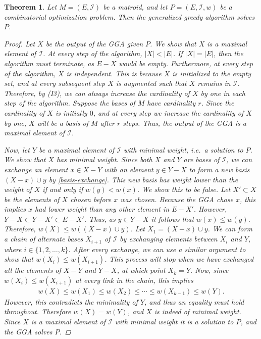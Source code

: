\documentclass[a4paper,11pt]{report}
\theoremstyle{plain}
\newtheorem{thm}{Theorem}[section]
\theoremstyle{definition}
\newcommand{\I}{\mathcal{I}}
\begin{document}
\begin{thm}\label{GGA-solves-matroids}
Let $M = (E,\I)$ be a matroid, and let $P = (E,\I,w)$ be a combinatorial
optimization problem. Then the generalized greedy algorithm solves $P$.

\begin{proof}

Let $X$ be the output of the GGA given $P$. We show that $X$ is a maximal
element of $\I$. At every step of the algorithm, $|X| < |E|$. If $|X| = |E|$,
then the algorithm must terminate, as $E - X$ would be empty. Furthermore, at
every step of the algorithm, $X$ is independent. This is because $X$ is
initialized to the empty set, and at every subsequent step $X$ is augmented
such that $X$ remains in $\I$. Therefore, by (I3), we can always increase the
cardinality of $X$ by one in each step of the algorithm. Suppose the bases of
$M$ have cardinality $r$.  Since the cardinality of $X$ is initially $0$, and
at every step we increase the cardinality of $X$ by one, $X$ will be a basis of
$M$ after $r$ steps. Thus, the output of the GGA is a maximal element of $\I$.

Now, let $Y$ be a maximal element of $\I$ with minimal weight, i.e.\ a solution
to $P$. We show that $X$ has minimal weight. Since both $X$ and $Y$ are bases
of $\I$, we can exchange an element $x \in X - Y$ with an element $y \in Y - X$
to form a new basis $(X - x) \cup y$ by \autoref{basis-exchange}. This new
basis has weight lower than the weight of $X$ if and only if $w(y) < w(x)$. We
show this to be false. Let $X' \subset X$ be the elements of $X$ chosen before
$x$ was chosen. Because the GGA chose $x$, this implies $x$ had lower weight
than any other element in $E - X'$. However, $Y - X \subset Y - X' \subset E -
X'$. Thus, as $y \in Y - X$ it follows that $w(x) \leq w(y)$. Therefore, $w(X)
\leq w((X - x) \cup y)$. Let $X_1 = (X - x) \cup y$. We can form a chain of
alternate bases $X_{i+1}$ of $\I$ by exchanging elements between $X_i$ and $Y$,
where $i \in \{1,2,\ldots,k\}$. After every exchange, we can use a similar
argument to show that $w(X_i) \leq w(X_{i+1})$. This process will stop when we
have exchanged all the elements of $X - Y$ and $Y - X$, at which point $X_k =
Y$. Now, since $w(X_i) \leq w(X_{i+1})$ at every link in the chain, this
implies
\begin{align*}
    w(X) \leq w(X_1) \leq w(X_2) \leq \cdots \leq w(X_{k - 1}) \leq w(Y).
\end{align*}
However, this contradicts the minimality of $Y$, and thus an equality must hold
throughout. Therefore $w(X) = w(Y)$, and $X$ is indeed of minimal weight. Since
$X$ is a maximal element of $\I$ with minimal weight it is a solution to $P$,
and the GGA solves $P$.
\end{proof}
\end{thm}
\end{document}
